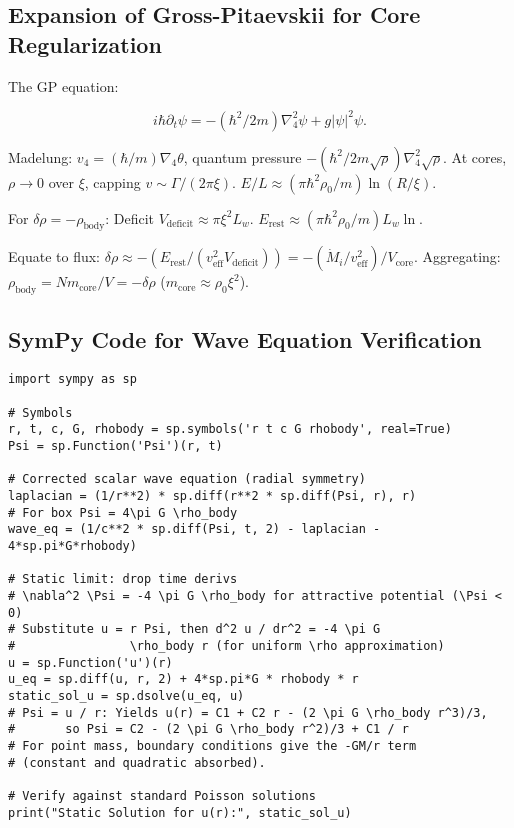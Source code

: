 \documentclass{article}
\begin{document}
\subsection{Expansion of Gross-Pitaevskii for Core Regularization}

The GP equation:

\[
i \hbar \partial_t \psi = - (\hbar^2 / 2 m) \nabla_4^2 \psi + g | \psi |^2 \psi.
\]

Madelung: $v_4 = (\hbar / m) \nabla_4 \theta$, quantum pressure $- (\hbar^2 / 2 m \sqrt \rho) \nabla_4^2 \sqrt \rho$. At cores, $\rho \to 0$ over $\xi$, capping $v \sim \Gamma / (2\pi \xi)$. $E / L \approx (\pi \hbar^2 \rho_0 / m) \ln(R / \xi)$.

For $\delta \rho = - \rho_{\text{body}}$: Deficit $V_{\text{deficit}} \approx \pi \xi^2 L_w$. $E_{\text{rest}} \approx (\pi \hbar^2 \rho_0 / m) L_w \ln$.

Equate to flux: $\delta \rho \approx - (E_{\text{rest}} / (v_{\text{eff}}^2 V_{\text{deficit}})) = - (\dot M_i / v_{\text{eff}}^2) / V_{\text{core}}$. Aggregating: $\rho_{\text{body}} = N m_{\text{core}} / V = - \delta \rho$ ($m_{\text{core}} \approx \rho_0 \xi^2$).

\subsection{SymPy Code for Wave Equation Verification}

\begin{verbatim}
import sympy as sp

# Symbols
r, t, c, G, rhobody = sp.symbols('r t c G rhobody', real=True)
Psi = sp.Function('Psi')(r, t)

# Corrected scalar wave equation (radial symmetry)
laplacian = (1/r**2) * sp.diff(r**2 * sp.diff(Psi, r), r)
# For box Psi = 4\pi G \rho_body
wave_eq = (1/c**2 * sp.diff(Psi, t, 2) - laplacian - 4*sp.pi*G*rhobody)

# Static limit: drop time derivs
# \nabla^2 \Psi = -4 \pi G \rho_body for attractive potential (\Psi < 0)
# Substitute u = r Psi, then d^2 u / dr^2 = -4 \pi G
#                \rho_body r (for uniform \rho approximation)
u = sp.Function('u')(r)
u_eq = sp.diff(u, r, 2) + 4*sp.pi*G * rhobody * r
static_sol_u = sp.dsolve(u_eq, u)
# Psi = u / r: Yields u(r) = C1 + C2 r - (2 \pi G \rho_body r^3)/3,
#       so Psi = C2 - (2 \pi G \rho_body r^2)/3 + C1 / r
# For point mass, boundary conditions give the -GM/r term
# (constant and quadratic absorbed).

# Verify against standard Poisson solutions
print("Static Solution for u(r):", static_sol_u)
\end{verbatim}
\end{document}
